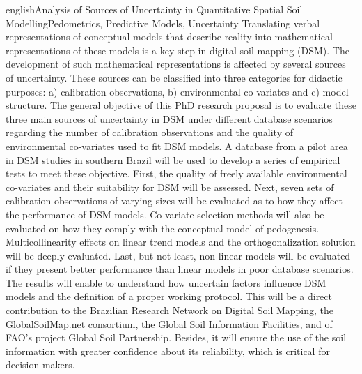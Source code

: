 \documentclass[tese,english]{UFRuralRJ}
\begin{document}
\def\tituloingles{Analysis of Sources of Uncertainty in Quantitative Spatial 
  Soil Modelling}
\def\chavesingles{Pedometrics, Predictive Models, Uncertainty}
\generalabstracttrue
\begin{generalabstract}{english}{\tituloingles}{\chavesingles}
Translating verbal representations of conceptual models that describe reality 
into mathematical representations of these models is a key step in digital soil 
mapping (DSM). The development of such mathematical representations is affected 
by several sources of uncertainty. These sources can be classified into three 
categories for didactic purposes: a) calibration observations, b) environmental
co-variates and c) model structure. The general objective of this PhD research 
proposal is to evaluate these three main sources of uncertainty in DSM under 
different database scenarios regarding the number of calibration observations 
and the quality of environmental co-variates used to fit DSM models. A database 
from a pilot area in DSM studies in southern Brazil will be used to develop a 
series of empirical tests to meet these objective. First, the quality of freely 
available environmental co-variates and their suitability for DSM will be 
assessed. Next, seven sets of calibration observations of varying sizes will be 
evaluated as to how they affect the performance of DSM models. Co-variate 
selection methods will also be evaluated on how they comply with the conceptual 
model of pedogenesis. Multicollinearity effects on linear trend models and the 
orthogonalization solution will be deeply evaluated. Last, but not least, 
non-linear models will be evaluated if they present better performance than 
linear models in poor database scenarios. The results will enable to understand 
how uncertain factors influence DSM models and the definition of a proper 
working protocol. This will be a direct contribution to the Brazilian Research 
Network on Digital Soil Mapping, the GlobalSoilMap.net consortium, the Global 
Soil Information Facilities, and of FAO's project Global Soil Partnership. 
Besides, it will ensure the use of the soil information with greater confidence 
about its reliability, which is critical for decision makers.
\end{generalabstract}
\end{document}
